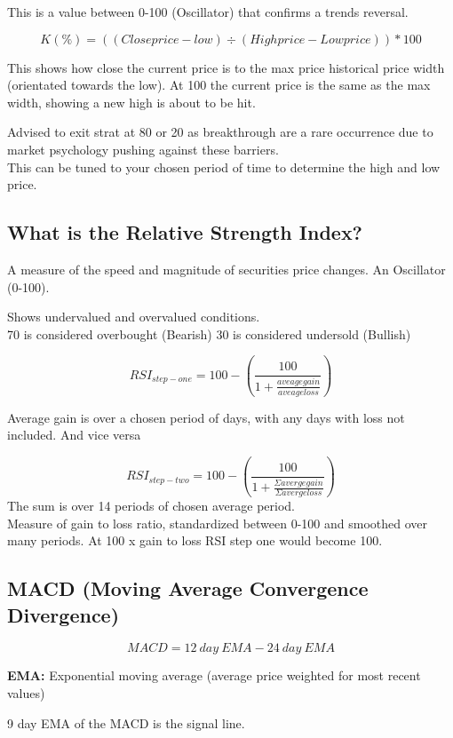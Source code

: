 \documentclass[11pt]{scrartcl} %
\begin{document}
This is a value between 0-100 (Oscillator) that confirms a trends reversal.

\[ K(\%) = ((Close price - low) \div (High price - Low price)) * 100\] 

This shows how close the current price is to the max price historical price width (orientated towards the low).
At 100 the current price is the same as the max width, showing a new high is about to be hit.

Advised to exit strat at 80 or 20 as breakthrough are a rare occurrence due to market psychology pushing
against these barriers.\\

This can be tuned to your chosen period of time to determine the high and low price.

\subsection{What is the Relative Strength Index?}

A measure of the speed and magnitude of securities price changes. An Oscillator (0-100).

Shows undervalued and overvalued conditions.\\

70 is considered overbought (Bearish)
30 is considered undersold (Bullish)

\[ RSI_{step-one} = 100 - (\frac{100}{1+\frac{aveage gain}{aveage loss}}) \]

Average gain is over a chosen period of days, with any days with loss not included. And vice versa

\[ RSI_{step-two} = 100 - (\frac{100}{1+ \frac{\Sigma avergegain}{\Sigma averge loss}}) \]
The sum is over 14 periods of chosen average period.\\

Measure of gain to loss ratio, standardized between 0-100 and smoothed over many periods. At 100 x gain to loss RSI step one would become 100.

\subsection{MACD (Moving Average Convergence Divergence)}

\[ MACD = 12\:day\:EMA - 24\:day\:EMA \] 

\textbf{EMA:} Exponential moving average (average price weighted for most recent values)

9 day EMA of the MACD is the signal line.\\
\end{document}

